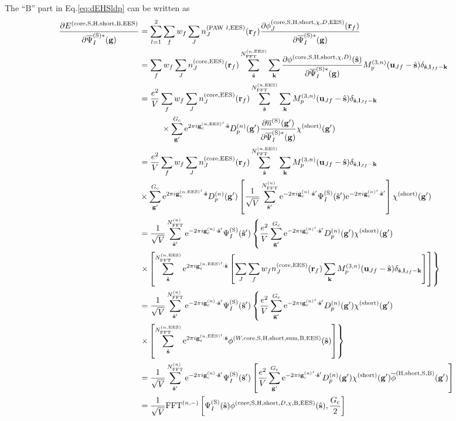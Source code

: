 \documentclass[paper=a4, fontsize=11pt]{article} %
\numberwithin{equation}{section} %
\numberwithin{figure}{section} %
\numberwithin{table}{section} %
\newcommand{\p}{\partial}
\newcommand{\ol}{\overline}
\newcommand{\bu}{{\bf{u}}}
\newcommand{\bl}{{\bf{l}}}
\newcommand{\bk}{{\bf{k}}}
\newcommand{\bs}{{\bf{s}}}
\newcommand{\bg}{{\bf{g}}}
\newcommand{\br}{{\bf{r}}}
\newcommand{\hs}{{\hat{\bf{s}}}}
\newcommand{\rS}{{\mathrm{S}}}
\newcommand{\rEES}{{\mathrm{EES}}}
\newcommand{\rcore}{{\mathrm{core}}}
\newcommand{\re}{{\mathrm{e}}}
\newcommand{\rshort}{{\mathrm{short}}}
\newcommand{\rP}{{\mathrm{PAW}}}
\newcommand{\rH}{{\mathrm{H}}}
\newcommand{\rB}{{\mathrm{B}}}
\newcommand{\rsum}{{\mathrm{sum}}}
\newcommand{\gcn}{{\bg_c^{(n)}}}
\newcommand{\gcnEES}{{\bg_c^{(n,\rEES)}}}
\newcommand{\igcns}{2\pi i\gcn\cdot\hat \bs}
\newcommand{\igpcns}{2\pi i\gcn'\cdot\hat \bs}
\newcommand{\igpcnEESs}{2\pi i\gcnEES'\cdot\hat \bs}
\newcommand{\psigsc}{{\overline \Psi_I^{(\rS)*}(\bg)}}
\newcommand{\NFFTn}{{N^{(n)}_{\mathrm{FFT}}}}
\newcommand{\NFFTnEES}{{N^{(n,\rEES)}_{\mathrm{FFT}}}}
\newcommand{\Gc}{{G_{\mathrm{c}}}}
\newcommand{\hGc}{{\frac{G_{\mathrm{c}}}{2}}}
\newcommand{\Dngp}{{D^{(n)}_p(\bg')}}
\newcommand{\Mn}{{M_p^{(3,n)}}}
\newcommand{\FFTni}{{\mathrm{FFT}^{(n,-)}}}
\begin{document}
The ``$\rB$'' part in Eq.\eqref{eq:dEHSldp} can be written as
\begin{equation}
\begin{split}
\frac{\p E^{(\rcore,\rS,\rH,\rshort,\rB,\rEES)}}{\p \psigsc}
&= \sum_{l=1}^2\sum_f w_f \sum_J  n_J^{(\rP\ l,\rEES)}(\br_f) \frac{\p \phi_J^{(\rcore,\rS,\rH,\rshort,\chi,D,\rEES)}(\br_f)}{\p \psigsc} \\
&= \sum_f w_f \sum_J  n_J^{(\rcore,\rEES)}(\br_f) \sum_{\hat \bs}^\NFFTnEES \sum_{\bk} \frac{\p \phi^{(\rcore,\rS,\rH,\rshort,\chi,D)}(\hs)}{\p \psigsc}\Mn(\bu_{Jf}-\hat \bs)\delta_{\hat \bs,\bl_{Jf}-\bk} \\
&= \frac{e^2}{V} \sum_f w_f \sum_J  n_J^{(\rcore,\rEES)}(\br_f) \sum_{\hat \bs}^\NFFTnEES \sum_{\bk} \Mn(\bu_{Jf}-\hat \bs)\delta_{\hat \bs,\bl_{Jf}-\bk} \\
&\ \ \ \ \ \ \ \ \times \sum_{\bg'}^\Gc \re^{\igpcnEESs}  \Dngp \frac{\p \ol n^{(\rS)}(\bg')}{\p \psigsc}\chi^{(\rshort)}(\bg') \\
&= \frac{e^2}{V} \sum_f w_f \sum_J  n_J^{(\rcore,\rEES)}(\br_f) \sum_{\hat \bs}^\NFFTnEES \sum_{\bk} \Mn(\bu_{Jf}-\hat \bs)\delta_{\hat \bs,\bl_{Jf}-\bk} \\
&\times \sum_{\bg'}^\Gc \re^{\igpcnEESs}  \Dngp \left[\frac{1}{\sqrt V} \sum_{\hat \bs'}^\NFFTn   \re^{-\igcns'}\Psi_{I}^{(\rS)}(\hat \bs') \re^{-\igpcns'}\right]\chi^{(\rshort)}(\bg') \\
&= \frac{1}{\sqrt V} \sum_{\hat \bs'}^\NFFTn   \re^{-\igcns'}\Psi_{I}^{(\rS)}(\hat \bs') \left\{\frac{e^2}{V} \sum_{\bg'}^\Gc \re^{-\igpcns'} \Dngp \chi^{(\rshort)}(\bg') \right. \\
&\left. \times \left[\sum_{\hat \bs}^\NFFTnEES \re^{\igpcnEESs} \left[\sum_J \sum_f w_f n_J^{(\rcore,\rEES)}(\br_f)  \sum_{\bk} \Mn(\bu_{Jf}-\hat \bs)\delta_{\hat \bs,\bl_{Jf}-\bk}\right] \right]\right\}\\
&= \frac{1}{\sqrt V} \sum_{\hat \bs'}^\NFFTn   \re^{-\igcns'}\Psi_{I}^{(\rS)}(\hat \bs') \left\{\frac{e^2}{V} \sum_{\bg'}^\Gc \re^{-\igpcns'} \Dngp \chi^{(\rshort)}(\bg') \right. \\
&\left. \times \left[\sum_{\hat \bs}^\NFFTnEES \re^{\igpcnEESs} \phi^{(W,\rcore,\rS,\rH,\rshort,\rsum,\rB,\rEES)}(\hs) \right]\right\}\\
&= \frac{1}{\sqrt V} \sum_{\hat \bs'}^\NFFTn   \re^{-\igcns'}\Psi_{I}^{(\rS)}(\hat \bs') \left[\frac{e^2}{V} \sum_{\bg'}^\Gc \re^{-\igpcns'} \Dngp \chi^{(\rshort)}(\bg') \ol \phi^{(\rH,\rshort,\rS,\rB)}(\bg')\right]\\
&= \frac{1}{\sqrt V} \FFTni \left[\Psi_{I}^{(\rS)}(\hat \bs)\phi^{(\rcore,\rS,\rH,\rshort,D,\chi,\rB,\rEES)}(\hs),\hGc\right]\\
\end{split}
\end{equation}
\end{document}

